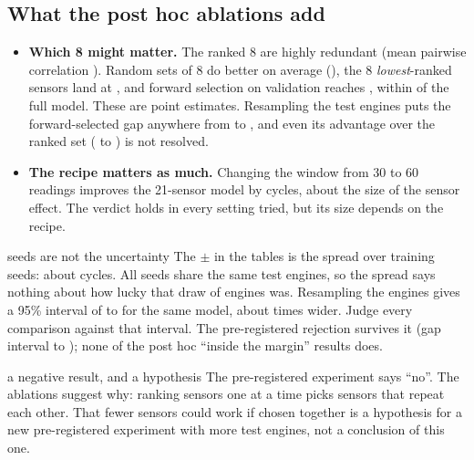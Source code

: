 \documentclass[11pt,a4paper]{article}
\begin{document}
\subsection{What the post hoc ablations add}
\begin{itemize}
\item \textbf{Which 8 might matter.} The ranked 8 are highly redundant (mean pairwise correlation
\RedundancyReducedEight{}). Random sets of 8 do better on average (\RandomEightTestRmse{}), the 8
\emph{lowest}-ranked sensors land at \PosthocGbrWorstEightTestRmse{}, and forward selection on validation reaches
\PosthocGbrGreedyEightTestRmse{}, within \GreedyEightGap{} of the full model. These are point estimates. Resampling the
\SplitTest{} test engines puts the forward-selected gap anywhere from \BootGreedyEightGapLow{} to \BootGreedyEightGapHigh{},
and even its advantage over the ranked set (\BootGreedyEightVsRankedLow{} to \BootGreedyEightVsRankedHigh{}) is not
resolved.
\item \textbf{The recipe matters as much.} Changing the window from 30 to 60 readings improves the 21-sensor
model by \WindowEffectFullTwoOne{} cycles, about the size of the sensor effect. The verdict holds in every
setting tried, but its size depends on the recipe.
\end{itemize}

\begin{keyidea}{seeds are not the uncertainty}
The $\pm$ in the tables is the spread over training seeds: about \MainGbrFullTwoOneTestRmseStd{} cycles. All seeds share the
same \SplitTest{} test engines, so the spread says nothing about how lucky that draw of engines was. Resampling the engines
gives a 95\% interval of \BootFullTwoOneCiLow{} to \BootFullTwoOneCiHigh{} for the same model, about \BootCiOverSeed{} times
wider. Judge every comparison against that interval. The pre-registered rejection survives it (gap interval
\BootReducedEightGapLow{} to \BootReducedEightGapHigh{}); none of the post hoc ``inside the margin'' results does.
\end{keyidea}

\begin{keyidea}{a negative result, and a hypothesis}
The pre-registered experiment says ``no''. The ablations suggest why: ranking sensors one at a time picks sensors that
repeat each other. That fewer sensors could work if chosen together is a hypothesis for a new pre-registered
experiment with more test engines, not a conclusion of this one.
\end{keyidea}
\end{document}
